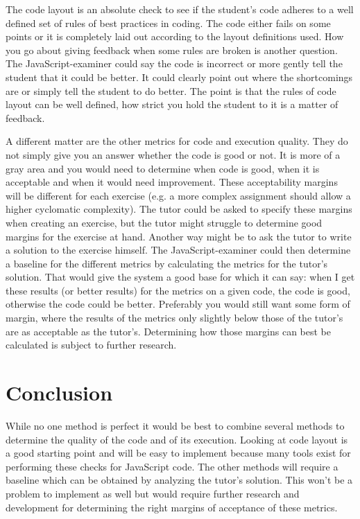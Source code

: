 \documentclass{article}
\begin{document}
The code layout is an absolute check to see if the student's code adheres to a
well defined set of rules of best practices in coding. The code either fails on
some points or it is completely laid out according to the layout definitions
used. How you go about giving feedback when some rules are broken is another
question. The JavaScript-examiner could say the code is incorrect or more
gently tell the student that it could be better. It could clearly point out
where the shortcomings are or simply tell the student to do better. The point
is that the rules of code layout can be well defined, how strict you hold the
student to it is a matter of feedback.

A different matter are the other metrics for code and execution quality. They
do not simply give you an answer whether the code is good or not. It is more of
a gray area and you would need to determine when code is good, when it is
acceptable and when it would need improvement. These acceptability margins will
be different for each exercise (e.g. a more complex assignment should allow a
higher cyclomatic complexity). The tutor could be asked to specify these
margins when creating an exercise, but the tutor might struggle to determine
good margins for the exercise at hand. Another way might be to ask the tutor to
write a solution to the exercise himself. The JavaScript-examiner could then
determine a baseline for the different metrics by calculating the metrics for
the tutor's solution. That would give the system a good base for which it can
say: when I get these results (or better results) for the metrics on a given
code, the code is good, otherwise the code could be better. Preferably you
would still want some form of margin, where the results of the metrics only
slightly below those of the tutor's are as acceptable as the
tutor's. Determining how those margins can best be calculated is subject to
further research.

\section{Conclusion}

While no one method is perfect it would be best to combine several methods to
determine the quality of the code and of its execution. Looking at code layout
is a good starting point and will be easy to implement because many tools exist
for performing these checks for JavaScript code. The other methods will require
a baseline which can be obtained by analyzing the tutor's solution. This won't
be a problem to implement as well but would require further research and
development for determining the right margins of acceptance of these metrics.
\end{document}
